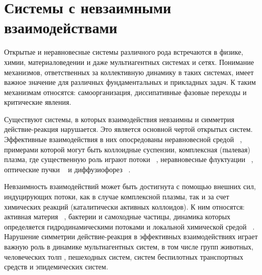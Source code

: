 



\section{Системы с невзаимными взаимодействами}

Открытые и неравновесные системы различного рода встречаются в физике, химии, материаловедении и даже мультиагентных системах и сетях. Понимание  механизмов, ответственных за коллективную динамику в таких системах, имеет важное значение для различных фундаментальных и прикладных задач. К таким механизмам относятся: самоорганизация, диссипативные фазовые переходы и критические явления.

Существуют системы, в которых взаимодействия невзаимны и симметрия действие-реакция нарушается. Это является основной чертой открытых систем. Эффективные взаимодействия в них опосредованы неравновесной средой ~\cite{10.1103/PhysRevX.5.011035}, примерами которой могут быть коллоидные суспензии, комплексная (пылевая) плазма, где существенную роль играют потоки ~\cite{PhysRevE.94.062139, PhysRevLett.91.248301}, неравновесные флуктуации ~\cite{PhysRevE.78.020102}, оптические пучки ~\cite{RevModPhys.82.1767} и диффузиофорез ~\cite{PhysRevLett.105.218103}.


Невзаимность взаимодействий может быть достигнута с помощью внешних сил, индуцирующих потоки, как в случае комплексной плазмы, так и за счет химических реакций (каталитически активных коллоидов). К ним относятся: активная материя ~\cite{Doostmohammadi, Trepat2018, Prost2015}, бактерии и самоходные частицы, динамика которых определяется гидродинамическими потоками и локальной химической средой ~\cite{10.1103/revmodphys.88.045006}. Нарушение симметрии действие-реакция в эффективных взаимодействиях играет важную роль в динамике мультиагентных систем, в том числе групп животных, человеческих толп \cite{PhysRevLett.110.228701}, пешеходных систем, систем беспилотных транспортных средств и эпидемических систем.

